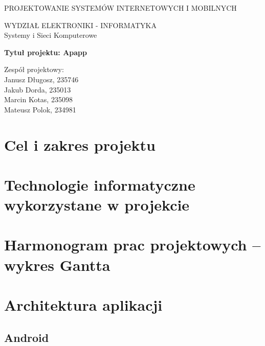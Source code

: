 \documentclass[polish, 11pt]{article}
\begin{document}
{
    \centering
    \Huge{PROJEKTOWANIE SYSTEMÓW INTERNETOWYCH I MOBILNYCH}
\vspace{2cm}

    \huge{WYDZIAŁ ELEKTRONIKI - INFORMATYKA \\ Systemy i Sieci Komputerowe}
\vspace{2cm}

    \LARGE{\textbf{Tytuł projektu: Apapp}}
\vspace{3cm}

    \begin{flushright}
        Zespół projektowy:\\
        Janusz Długosz, 235746\\
        Jakub Dorda, 235013\\
        Marcin Kotas, 235098\\
        Mateusz Polok, 234981
        
    \end{flushright}
}
\newpage
\tableofcontents
\newpage

\section{Cel i zakres projektu}

\section{Technologie informatyczne wykorzystane w projekcie}

\section{Harmonogram prac projektowych – wykres Gantta}

\section{Architektura aplikacji}

\subsection{Android}
\end{document}
